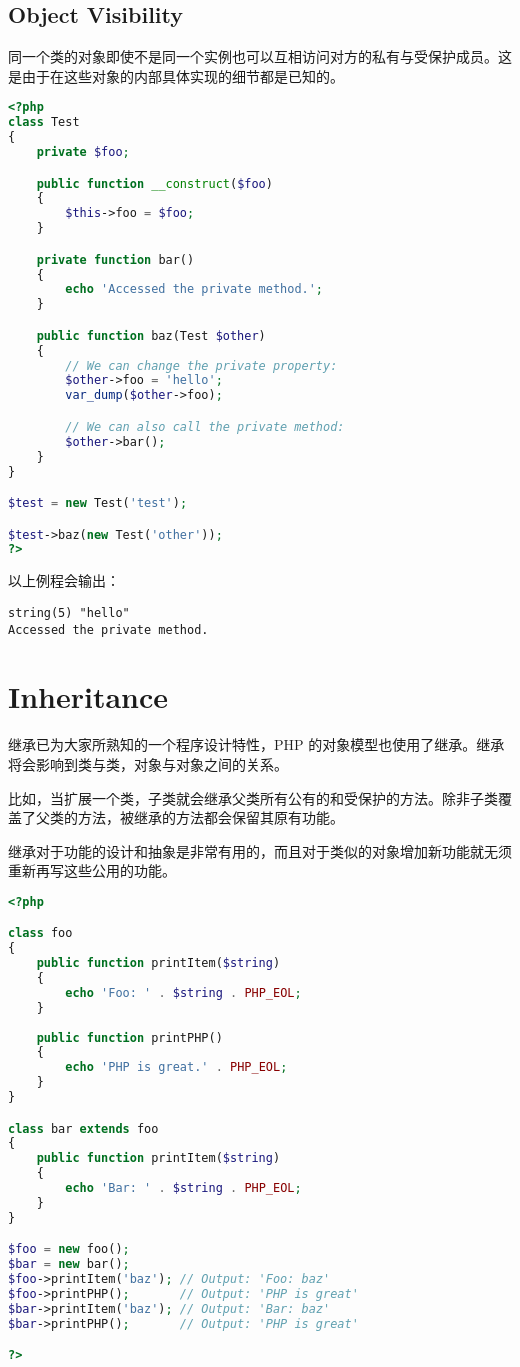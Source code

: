\section{Object Visibility}

同一个类的对象即使不是同一个实例也可以互相访问对方的私有与受保护成员。这是由于在这些对象的内部具体实现的细节都是已知的。

\begin{lstlisting}[language=PHP]
<?php
class Test
{
    private $foo;

    public function __construct($foo)
    {
        $this->foo = $foo;
    }

    private function bar()
    {
        echo 'Accessed the private method.';
    }

    public function baz(Test $other)
    {
        // We can change the private property:
        $other->foo = 'hello';
        var_dump($other->foo);

        // We can also call the private method:
        $other->bar();
    }
}

$test = new Test('test');

$test->baz(new Test('other'));
?>
\end{lstlisting}

以上例程会输出：

\begin{verbatim}
string(5) "hello"
Accessed the private method.
\end{verbatim}


\chapter{Inheritance}

继承已为大家所熟知的一个程序设计特性，PHP 的对象模型也使用了继承。继承将会影响到类与类，对象与对象之间的关系。

比如，当扩展一个类，子类就会继承父类所有公有的和受保护的方法。除非子类覆盖了父类的方法，被继承的方法都会保留其原有功能。

继承对于功能的设计和抽象是非常有用的，而且对于类似的对象增加新功能就无须重新再写这些公用的功能。




\begin{lstlisting}[language=PHP]
<?php

class foo
{
    public function printItem($string) 
    {
        echo 'Foo: ' . $string . PHP_EOL;
    }
    
    public function printPHP()
    {
        echo 'PHP is great.' . PHP_EOL;
    }
}

class bar extends foo
{
    public function printItem($string)
    {
        echo 'Bar: ' . $string . PHP_EOL;
    }
}

$foo = new foo();
$bar = new bar();
$foo->printItem('baz'); // Output: 'Foo: baz'
$foo->printPHP();       // Output: 'PHP is great' 
$bar->printItem('baz'); // Output: 'Bar: baz'
$bar->printPHP();       // Output: 'PHP is great'

?>
\end{lstlisting}


